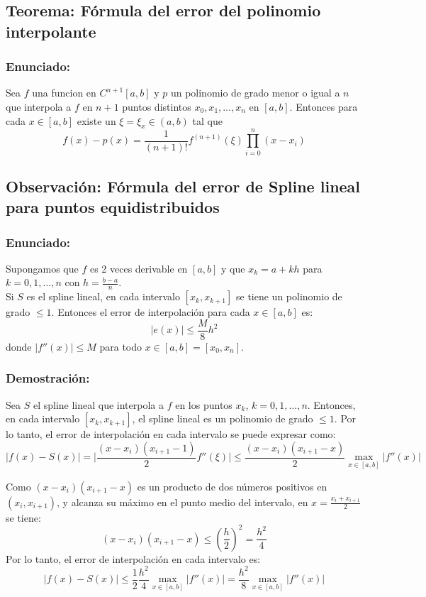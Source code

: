 \documentclass[a4paper,12pt]{article}
\begin{document}
\subsection{Teorema: Fórmula del error del polinomio interpolante}
\subsubsection{Enunciado:}
Sea $f$ una funcion en $C^{n+1}[a,b]$ y $p$ un polinomio de grado menor o igual a $n$ que interpola a $f$ en $n+1$ puntos distintos $x_0, x_1, \dots , x_n$ en $[a,b]$. Entonces para cada $x\in [a,b]$ existe un $\xi = \xi _x \in (a,b)$ tal que 
\[
f(x)-p(x)=\frac{1}{(n+1)!}f^{(n+1)}(\xi)\prod_{i=0}^{n}(x-x_i)
\]

\subsection{Observación: Fórmula del error de Spline lineal para puntos equidistribuidos}

\subsubsection{Enunciado:}

Supongamos que $f$ es 2 veces derivable en $[a,b]$ y que $x_k=a+kh$ para $k=0,1,\dots ,n$ con $h=\frac{b-a}{n}$. \\
Si $S$ es el spline lineal, en cada intervalo $[x_k,x_{k+1}]$ se tiene un polinomio de grado $\leq 1$. Entonces el error de interpolación para cada $x\in [a,b]$ es:
\[
\lvert e(x) \rvert \leq \frac{M}{8}h^2
\]
donde $\lvert f''(x)\rvert\leq M$ para todo $x\in [a,b]=[x_0,x_n]$.

\subsubsection{Demostración:}

Sea $S$ el spline lineal que interpola a $f$ en los puntos $x_k$, $k=0,1,\dots ,n$. Entonces, en cada intervalo $[x_k,x_{k+1}]$, el spline lineal es un polinomio de grado $\leq 1$. Por lo tanto, el error de interpolación en cada intervalo se puede expresar como:
\[
\lvert f(x)-S(x) \rvert = \lvert \frac{(x-x_i)(x_{i+1}-1)}{2}f''(\xi) \rvert \leq \frac{(x-x_i)(x_{i+1}-x)}{2} \max \limits_{x \in [a,b]} \lvert f''(x) \rvert
\]

Como $(x-x_i)(x_{i+1}-x)$ es un producto de dos números positivos en $(x_i,x_{i+1})$, y alcanza su máximo en el punto medio del intervalo, en $x=\frac{x_i+x_{i+1}}{2}$ se tiene:
\[ 
(x-x_i)(x_{i+1}-x) \leq (\frac{h}{2})^2 = \frac{h^2}{4}
\]
Por lo tanto, el error de interpolación en cada intervalo es:
\[
\lvert f(x)-S(x) \rvert \leq \frac{1}{2} \frac{h^2}{4} \max \limits_{x \in [a,b]} \lvert f''(x) \rvert = \frac{h^2}{8}\max \limits_{x \in [a,b]} \lvert f''(x) \rvert 
\]
\end{document}
